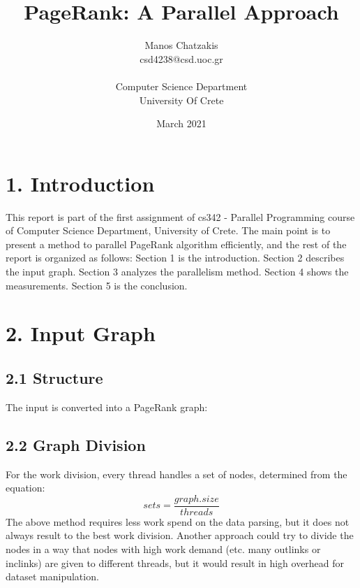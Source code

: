 \documentclass{article}
\title{\vspace{-2.0cm}\textbf{PageRank: A Parallel Approach}}
\author{Manos Chatzakis\\csd4238@csd.uoc.gr\\ \\ Computer Science Department \\ University Of Crete}
\date{March 2021}
\begin{document}
\maketitle


\section*{1. Introduction}
This report is part of the first assignment of cs342 - Parallel Programming course of Computer Science Department, University of Crete. The main point is to present a method to parallel PageRank algorithm efficiently, and the rest of the report is organized as follows: Section 1 is the introduction. Section 2 describes the input graph.
Section 3 analyzes the parallelism method. Section 4 shows the measurements. Section 5 is the conclusion.

\section*{2. Input Graph}
\subsection*{2.1 Structure}
The input is converted into a PageRank graph:
\begin{multicols}{3}



\end{multicols}

\subsection*{2.2 Graph Division}
For the work division, every thread handles a set of nodes, determined from the equation:
 \[sets = \frac{graph.size}{threads}\]
The above method requires less work spend on the data parsing, but it does not always result to the best work division. Another approach could try to divide the nodes in a way that nodes with high work demand (etc. many outlinks or inclinks) are given to different threads, but it would result in high overhead for dataset manipulation.
\end{document}

